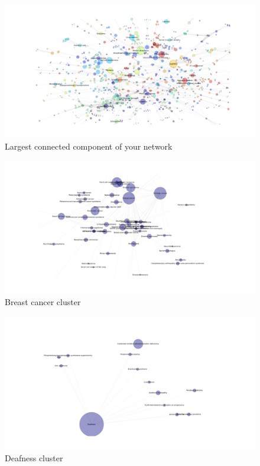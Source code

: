 \documentclass[a4paper,11pt]{article}
\begin{document}
\begin{figure}[h!]
\begin{center}
\includegraphics[scale=0.20]{disease.png}
\caption{Largest connected component of your network}
\label{dis}
\end{center}
\end{figure}

\begin{figure}[h!]
\begin{center}
\includegraphics[scale=0.30]{cancer.png}
\caption{Breast cancer cluster}
\label{cancer}
\end{center}
\end{figure}

\begin{figure}[h!]
\begin{center}
\includegraphics[scale=0.30]{deafness.png}
\caption{Deafness cluster}
\label{deaf}
\end{center}
\end{figure}
\end{document}
